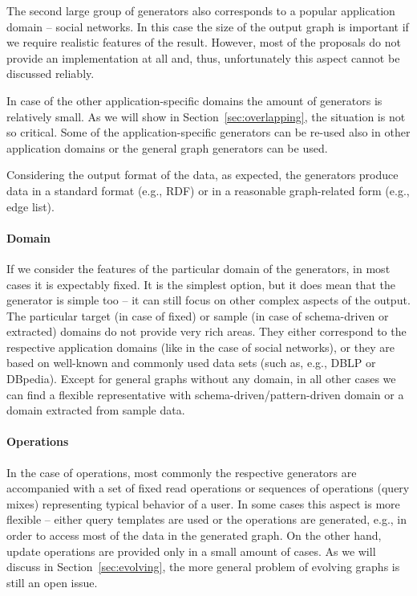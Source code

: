 The second large group of generators also corresponds to a popular application domain -- social networks. In this case the size of the output graph is important if we require realistic features of the result. However, most of the proposals do not provide an implementation at all and, thus, unfortunately this aspect cannot be discussed reliably.

In case of the other application-specific domains the amount of generators is relatively small. As we will show in Section~\ref{sec:overlapping}, the situation is not so critical. Some of the application-specific generators can be re-used also in other application domains or the general graph generators can be used.

Considering the output format of the data, as expected, the generators produce data in a standard format (e.g., RDF) or in a reasonable graph-related form (e.g., edge list).

\paragraph{Domain}

If we consider the features of the particular domain of the generators, in most cases it is expectably fixed. It is the simplest option, but it does mean that the generator is simple too -- it can still focus on other complex aspects of the output. The particular target (in case of fixed) or sample (in case of schema-driven or extracted) domains do not provide very rich areas. They either correspond to the respective application domains (like in the case of social networks), or they are based on well-known and commonly used data sets (such as, e.g., DBLP or DBpedia). Except for general graphs without any domain, in all other cases we can find a flexible representative with schema-driven/pattern-driven domain or a domain extracted from sample data.


\paragraph{Operations}
In the case of operations, most commonly the respective generators are accompanied with a set of fixed read operations or sequences of operations (query mixes) representing typical behavior of a user. In some cases this aspect is more flexible -- either query templates are used or the operations are generated, e.g., in order to access most of the data in the generated graph. On the other hand, update operations are provided only in a small amount of cases. As we will discuss in Section~\ref{sec:evolving}, the more general problem of evolving graphs is still an open issue.

